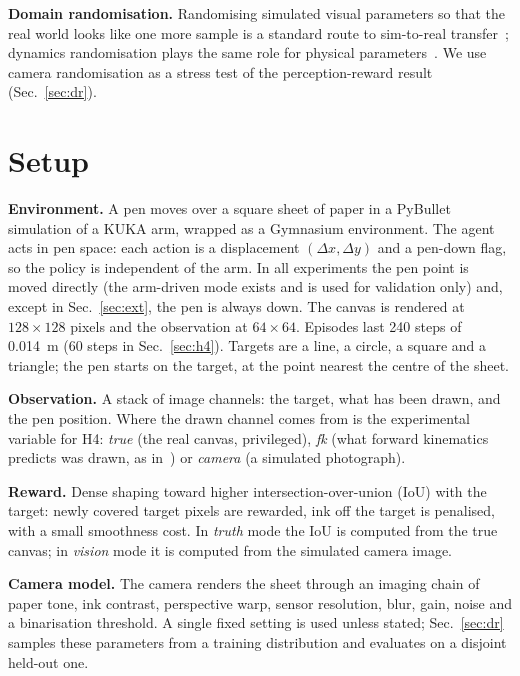 \documentclass[conference]{IEEEtran}
\begin{document}
\textbf{Domain randomisation.} Randomising simulated visual parameters so that the real
world looks like one more sample is a standard route to sim-to-real transfer~\cite{V01};
dynamics randomisation plays the same role for physical parameters~\cite{V02}. We use
camera randomisation as a stress test of the perception-reward result (Sec.~\ref{sec:dr}).

\section{Setup}
\label{sec:setup}
\textbf{Environment.} A pen moves over a square sheet of paper in a PyBullet simulation of
a KUKA arm, wrapped as a Gymnasium environment. The agent acts in pen space:
each action is a displacement $(\Delta x, \Delta y)$ and a pen-down flag, so the policy is
independent of the arm. In all experiments the pen point is moved directly (the arm-driven
mode exists and is used for validation only) and, except in Sec.~\ref{sec:ext}, the pen is
always down. The canvas is rendered at $128\times128$ pixels and the observation at
$64\times64$. Episodes last 240 steps of 0.014~m (60 steps in Sec.~\ref{sec:h4}). %
Targets are a line, a circle, a square and a triangle; the pen starts on the target, at
the point nearest the centre of the sheet.

\textbf{Observation.} A stack of image channels: the target, what has been drawn, and the
pen position. Where the drawn channel comes from is the experimental variable for H4:
\emph{true} (the real canvas, privileged), \emph{fk} (what forward kinematics predicts was
drawn, as in~\cite{D01}) or \emph{camera} (a simulated photograph).

\textbf{Reward.} Dense shaping toward higher intersection-over-union (IoU) with the target:
newly covered target pixels are rewarded, ink off the target is penalised, with a small
smoothness cost. In \emph{truth} mode the IoU is computed from the true canvas; in
\emph{vision} mode it is computed from the simulated camera image.

\textbf{Camera model.} The camera renders the sheet through an imaging chain of paper tone,
ink contrast, perspective warp, sensor resolution, blur, gain, noise and a binarisation
threshold. A single fixed setting is used unless stated; Sec.~\ref{sec:dr} samples these
parameters from a training distribution and evaluates on a disjoint held-out one.
\end{document}
